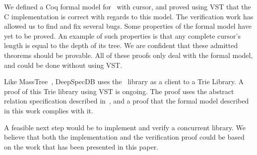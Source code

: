 We defined a Coq formal model for \btrees\ with cursor, and proved using VST that the C implementation is correct with regards to this model.
The verification work has allowed us to find and fix several bugs.
Some properties of the formal model have yet to be proved.
An example of such properties is that any complete cursor's length is equal to the depth of its tree.
We are confident that these admitted theorems should be provable.
All of these proofs only deal with the formal model, and could be done without using VST.

Like MassTree~\cite{masstree}, DeepSpecDB uses the \btrees\ library as a client to a Trie Library. A proof of this Trie library using VST is ongoing.
The proof uses the abstract relation specification described in~\cite{brian}, and a proof that the formal model described in this work complies with it.

A feasible next step would be to implement and verify a concurrent library.
We believe that both the implementation and the verification proof could be based on the work that has been presented in this paper.

